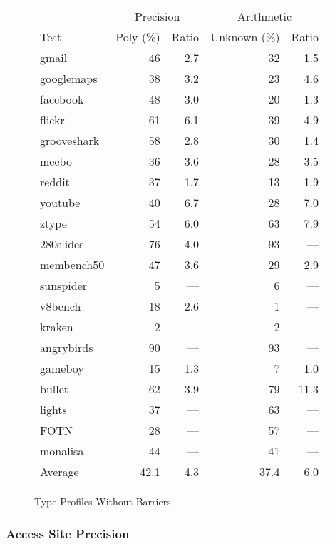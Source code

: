 \begin{figure}[ht]
\centering
\begin{tabular}{lrrrr}
\toprule
     & \multicolumn{2}{c}{Precision}
     & \multicolumn{2}{c}{Arithmetic} \\
\cmidrule(r){2-3}
\cmidrule{4-5}
Test & Poly (\%) & Ratio & Unknown (\%) & Ratio \\
\midrule
gmail          & 46 & 2.7 & 32 & 1.5 \\
googlemaps     & 38 & 3.2 & 23 & 4.6 \\
facebook       & 48 & 3.0 & 20 & 1.3 \\
flickr         & 61 & 6.1 & 39 & 4.9 \\
grooveshark    & 58 & 2.8 & 30 & 1.4 \\
meebo          & 36 & 3.6 & 28 & 3.5 \\
reddit         & 37 & 1.7 & 13 & 1.9 \\
youtube        & 40 & 6.7 & 28 & 7.0 \\
ztype          & 54 & 6.0 & 63 & 7.9 \\
280slides      & 76 & 4.0 & 93 & --- \\
membench50     & 47 & 3.6 & 29 & 2.9 \\
\midrule
sunspider      & 5 & --- & 6 & --- \\
v8bench        & 18 & 2.6 & 1 & --- \\
kraken         & 2 & --- & 2 & --- \\
\midrule
angrybirds     & 90 & --- & 93 & --- \\
gameboy        & 15 & 1.3 & 7 & 1.0 \\
bullet         & 62 & 3.9 & 79 & 11.3 \\
lights         & 37 & --- & 63 & --- \\
FOTN           & 28 & --- & 57 & --- \\
monalisa       & 44 & --- & 41 & --- \\
\midrule
Average        & 42.1 & 4.3 & 37.4 & 6.0 \\
\bottomrule
\end{tabular}
\nocaptionrule \caption{Type Profiles Without Barriers}
\label{fig:without_barriers}
\end{figure}

\subsubsection{Access Site Precision}
\label{sec:access_objects}

